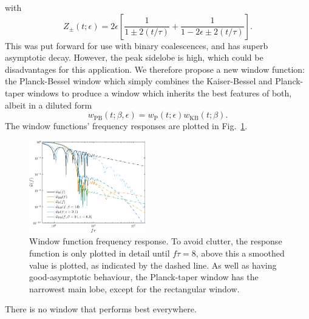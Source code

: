 \documentclass[useAMS,usedcolumn,usegraphicx,usenatbib]{mn2e}
\newcommand{\figref}[1]{Fig.~\ref{fig:#1}}
\newcommand{\sub}[1]{\ensuremath{_\mathrm{#1}}}
\newcommand{\recip}[1]{\ensuremath{\frac{1}{#1}}}
\begin{document}
with
\begin{equation}
Z_\pm(t; \epsilon) = 2\epsilon\left[\recip{1 \pm 2(t/\tau)} + \recip{1 - 2\epsilon \pm 2(t/\tau)}\right].
\end{equation}
This was put forward for use with binary coalescences, and has superb asymptotic decay. However, the peak sidelobe is high, which could be disadvantages for this application. We therefore propose a new window function: the Planck-Bessel window which simply combines the Kaiser-Bessel and Planck-taper windows to produce a window which inherits the best features of both, albeit in a diluted form
\begin{equation}
w\sub{PB}(t;\beta,\epsilon) = w\sub{P}(t; \epsilon)w\sub{KB}(t;\beta).
\end{equation}
The window functions' frequency responses are plotted in \figref{Response}.
\begin{figure}
  \begin{center}
  \includegraphics[width=0.45\textwidth]{Fig_Response}
    \caption{Window function frequency response. To avoid clutter, the response function is only plotted in detail until $f\tau = 8$, above this a smoothed value is plotted, as indicated by the dashed line. As well as having good-asymptotic behaviour, the Planck-taper window has the narrowest main lobe, except for the rectangular window.}
    \label{fig:Response}
  \end{center}
\end{figure}
There is no window that performs best everywhere.
\end{document}
